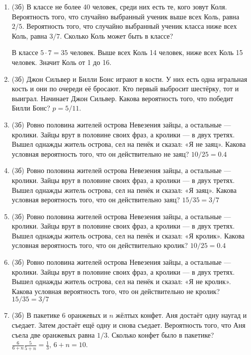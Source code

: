 \documentclass[a4paper, 12pt]{article}
\begin{document}
\newpage
\begin{enumerate}
\item (3б) В классе не более 40 человек, среди них есть те, кого зовут Коля. Вероятность того, что случайно выбранный ученик выше всех Коль, равна $2/5$. Вероятность того, что случайно выбранный ученик класса ниже всех Коль, равна $3/7$. Сколько Коль может быть в классе?

В классе $5\cdot 7=35$ человек. Выше всех Коль 14 человек, ниже всех Коль 15 человек. Значит Коль от 1 до 16.
\item (3б) Джон Сильвер и Билли Бонс играют в кости. У них есть одна игральная кость и они по очереди её бросают. Кто первый выбросит шестёрку, тот и выиграл. Начинает Джон Сильвер. Какова вероятность того, что победит Билли Бонс? $p=5/11$.
\item (3б) Ровно половина жителей острова Невезения зайцы, а остальные — кролики. Зайцы врут в половине своих фраз, а кролики — в двух третях. Вышел однажды житель острова, сел на пенёк и сказал: «Я не заяц». Какова условная вероятность того, что он действительно не заяц? $10/25=0.4$
\item (3б) Ровно половина жителей острова Невезения зайцы, а остальные — кролики. Зайцы врут в половине своих фраз, а кролики — в двух третях. Вышел однажды житель острова, сел на пенёк и сказал: «Я заяц». Какова условная вероятность того, что он действительно заяц? $15/35=3/7$
\item (3б) Ровно половина жителей острова Невезения зайцы, а остальные — кролики. Зайцы врут в половине своих фраз, а кролики — в двух третях. Вышел однажды житель острова, сел на пенёк и сказал: «Я кролик». Какова условная вероятность того, что он действительно кролик? $10/25=0.4$
\item (3б) Ровно половина жителей острова Невезения зайцы, а остальные — кролики. Зайцы врут в половине своих фраз, а кролики — в двух третях. Вышел однажды житель острова, сел на пенёк и сказал: «Я не кролик». Какова условная вероятность того, что он действительно не кролик? $15/35=3/7$
\item (3б) В пакетике 6 оранжевых и $n$ жёлтых конфет. Аня достаёт одну наугад и съедает. Затем достаёт ещё одну и снова съедает. Вероятность того, что Аня съела две оранжевых равна $1/3$. Сколько конфет было в пакетике? $\frac{6}{6+n}\frac{5}{5+n}=\frac{1}{3}$, $6+n=10$.

\end{enumerate}
\end{document}
